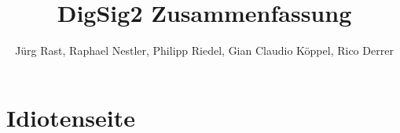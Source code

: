 \documentclass{scrartcl}
\title{DigSig2 Zusammenfassung}
\author{Jürg Rast, Raphael Nestler, Philipp Riedel, Gian Claudio Köppel, Rico Derrer}
\begin{document}
\maketitle
\newpage

\tableofcontents
\newpage








\section{Idiotenseite}



\begin{multicols}{2}






\end{multicols}

\end{document}
